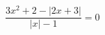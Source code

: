\begin{ex}[type=equation]
	\begin{condition}
		$\dfrac{3x^2 + 2 - \big|2x  + 3\big|}{\big| x\big| - 1} = 0$
	\end{condition}
\end{ex}